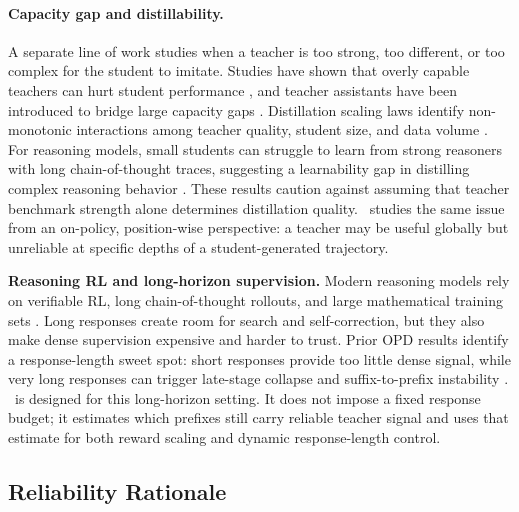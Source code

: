\paragraph{Capacity gap and distillability.}
A separate line of work studies when a teacher is too strong, too different, or too complex for the student to imitate.
Studies have shown that overly capable teachers can hurt student performance \citep{cho2019efficacy}, and teacher assistants have been introduced to bridge large capacity gaps \citep{mirzadeh2020improved}.
Distillation scaling laws identify non-monotonic interactions among teacher quality, student size, and data volume \citep{busbridge2025distillation}.
For reasoning models, small students can struggle to learn from strong reasoners with long chain-of-thought traces, suggesting a learnability gap in distilling complex reasoning behavior \citep{li2025small}.
These results caution against assuming that teacher benchmark strength alone determines distillation quality.
\method~studies the same issue from an on-policy, position-wise perspective: a teacher may be useful globally but unreliable at specific depths of a student-generated trajectory.


\noindent\textbf{Reasoning RL and long-horizon supervision.}
Modern reasoning models rely on verifiable RL, long chain-of-thought rollouts, and large mathematical training sets \citep{shao2024deepseekmath,guo2025deepseek,yu2025dapo,he2025justrl,accordion,dars,yang2025optibench,xu2026envfactoryscalingtooluseagents}.
Long responses create room for search and self-correction, but they also make dense supervision expensive and harder to trust.
Prior OPD results identify a response-length sweet spot: short responses provide too little dense signal, while very long responses can trigger late-stage collapse and suffix-to-prefix instability \citep{li2026rethinking}.
\method~is designed for this long-horizon setting.
It does not impose a fixed response budget; it estimates which prefixes still carry reliable teacher signal and uses that estimate for both reward scaling and dynamic response-length control.

\subsection{Reliability Rationale}
\label{app:rationale}

